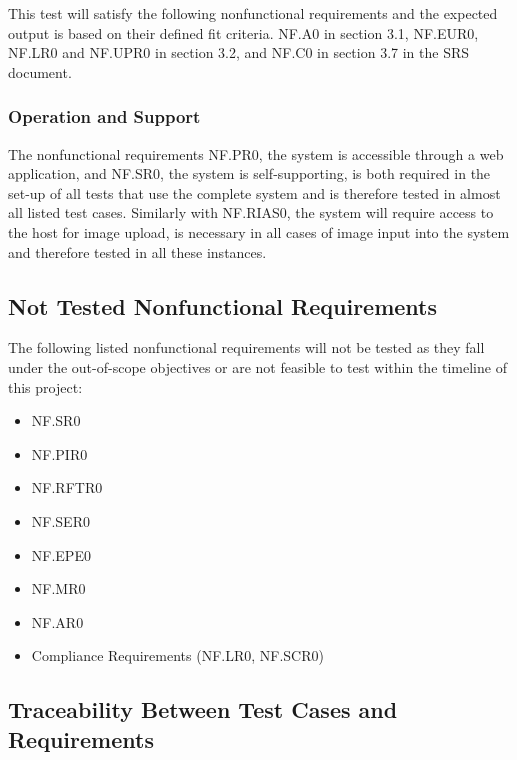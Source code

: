 \documentclass[12pt, titlepage]{article}
\begin{document}
This test will satisfy the following nonfunctional requirements and the expected output is based on their defined fit criteria. NF.A0 in section 3.1, NF.EUR0, NF.LR0 and NF.UPR0 in section 3.2, and NF.C0 in section 3.7 in the SRS document.

\subsubsection{Operation and Support}
\noindent The nonfunctional requirements NF.PR0, the system is accessible through a web application, and NF.SR0, the system is self-supporting, is both required in the set-up of all tests that use the complete system and is therefore tested in almost all listed test cases. Similarly with NF.RIAS0, the system will require access to the host for image upload, is necessary in all cases of image input into the system and therefore tested in all these instances. 

\subsection{Not Tested Nonfunctional Requirements}
The following listed nonfunctional requirements will not be tested as they fall under the out-of-scope objectives or are not feasible to test within the timeline of this project:
\begin{itemize}
    \item NF.SR0
    \item NF.PIR0
    \item NF.RFTR0
    \item NF.SER0
    \item NF.EPE0
    \item NF.MR0
    \item NF.AR0
    \item Compliance Requirements (NF.LR0, NF.SCR0)
\end{itemize}

\newpage

\subsection{Traceability Between Test Cases and Requirements}
\end{document}
